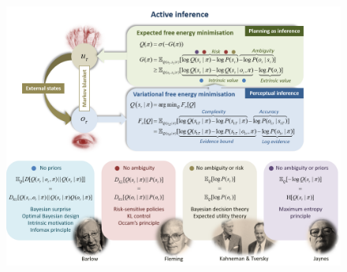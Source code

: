 \documentclass[review,12pt,authoryear]{elsarticle}
\begin{document}
\begin{figure}
    \centering
    \includegraphics[width=\textwidth]{FigureEFEinterpretations.png}
\end{figure}
\end{document}
